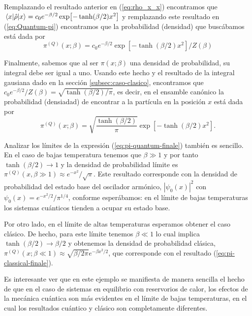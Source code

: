 \documentclass[%
 reprint,
 amsmath,amssymb,
 aps,
 pra,
]{revtex4-2}
\begin{document}
Remplazando el resultado anterior en  (\ref{eq:rho_x_x}) encontramos que $\ev{\hat{\rho}}{x}= c_0e^{-\beta/2}\exp[-\tanh(\beta/2)x^2]$ y remplazando este resultado en (\ref{eq:Quantum-pi}) encontramos que la probabilidad (densidad) que buscábamos está dada por
\begin{equation}
\pi^{(Q)}(x;\beta) = c_0e^{-\beta/2}\exp[-\tanh(\beta/2)x^2]/Z(\beta)
\end{equation}

Finalmente, sabemos que al ser $\pi(x;\beta)$ una densidad de probabilidad, su integral debe ser igual a uno. Usando este hecho y el resultado de la integral gausiana dado en la sección \ref{subsec:caso-clasico}, encontramos que $c_0 e^{-\beta/2}/Z(\beta)=\sqrt{\tanh(\beta/2)/\pi}$, es decir, en el ensamble canónico la probabilidad (densiadad) de encontrar a la partícula en la posición $x$ está dada por
\begin{equation}
\pi^{(Q)}(x;\beta) = \sqrt{\frac{\tanh(\beta/2)}{\pi}}\exp[-\tanh(\beta/2)x^2]. \label{eq:pi-quantum-finale}
\end{equation}


Analizar los límites de la expresión (\ref{eq:pi-quantum-finale}) también es sencillo. En el caso de bajas temperatura tenemos que $\beta \gg 1$ y por tanto $\tanh(\beta/2)\rightarrow 1$ y la densidad de probabilidad límite es $\pi^{(Q)}(x,\beta\gg 1) \approx e^{-x^2}/\sqrt{\pi}$. Este resultado corresponde con la densidad de probabilidad del estado base del oscilador armónico, $|\psi_0(x)|^2$  con $\psi_0(x)=e^{-x^2/2}/\pi^{1/4}$, conforme esperábamos: en el límite de bajas temperaturas los sistemas cuánticos tienden a ocupar su estado base.

Por otro lado, en el límite de altas temperaturas esperamos obtener el caso clásico. De hecho, para este límite tenemos $\beta \ll 1$ lo cual implica $\tanh(\beta/2)\rightarrow\beta/2$ y obtenemos la densidad de probabilidad clásica, $\pi^{(Q)}(x;\beta \ll 1) \approx \sqrt{\beta/2\pi}e^{-\beta x^2/2}$, que corresponde con el resultado (\ref{eq:pi-classical-finale}).

Es interesante ver que en este ejemplo se manifiesta de manera sencilla el hecho de que en el caso de sistemas en equilibrio con reservorios de calor, los efectos de la mecánica cuántica son más evidentes en el límite de bajas temperaturas, en el cual los resultados cuántico y clásico son completamente diferentes.
\linebreak
\end{document}
